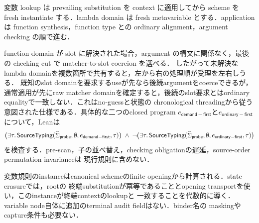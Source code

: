 変数 lookup は prevailing substitution を context に適用してから scheme を fresh instantiate
する．lambda domain は fresh metavariable とする．application は function synthesis，function
type との ordinary alignment，argument checking の順で進む．
\begin{mathpar}


\end{mathpar}
function domain が slot に解決された場合，argument の構文に関係なく，最後の checking cut で
matcher-to-slot coercion を選べる．
したがって未解決なlambda domainを複数箇所で共有すると，左から右の処理順が受理を左右しうる．
既知のslot domainを要求するuseが先なら後続argumentをcoerceできるが，通常適用が先にraw matcher
domainを確定すると，後続のslot要求とはordinary equalityで一致しない．これはno-guessと状態の
chronological threadingから従う意図された仕様である．具体的な二つのclosed program
$e_{\mathsf{demand-first}}$と$e_{\mathsf{ordinary-first}}$について，Leanは
\[
\bigl(\exists\tau.\,\mathsf{SourceTyping}
  (\widehat{\Sigma}_{\mathsf{probe}},\emptyset,e_{\mathsf{demand-first}},\tau)\bigr)
\;\land\;
\neg\bigl(\exists\tau.\,\mathsf{SourceTyping}
  (\widehat{\Sigma}_{\mathsf{probe}},\emptyset,e_{\mathsf{ordinary-first}},\tau)\bigr)
\]
を検査する．pre-scan，子の並べ替え，checking obligationの遅延，source-order permutation invarianceは
現行規則に含めない．

変数規則のinstanceはcanonical schemeのfinite openingから計算される．state erasureでは，rootの
終端substitutionが冪等であることとopening transportを使い，このinstanceが終端contextのlookupと
一致することを代数的に導く．variable node自体に追加のterminal audit fieldはない．binder名の
maskingやcapture条件も必要ない．

